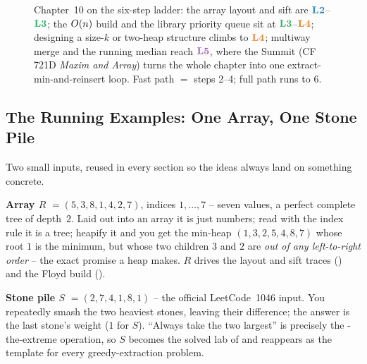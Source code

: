 \begin{figure}[H]
\centering
{}
\caption*{Chapter~10 on the six-step ladder: the array layout and sift are $\lv2$--$\lv3$; the $O(n)$
build and the library priority queue sit at $\lv3$--$\lv4$; designing a size-$k$ or two-heap structure
climbs to $\lv4$; multiway merge and the running median reach $\lv5$, where the Summit (CF 721D
\emph{Maxim and Array}) turns the whole chapter into one extract-min-and-reinsert loop. Fast path $=$
steps 2--4; full path runs to 6.}
\end{figure}

\subsection*{The Running Examples: One Array, One Stone Pile}

Two small inputs, reused in every section so the ideas always land on something concrete.

\textbf{Array $R$} $= (5, 3, 8, 1, 4, 2, 7)$, indices $1,\dots,7$ -- seven values, a perfect complete tree
of depth~$2$. Laid out into an array it is just numbers; read with the index rule it is a tree; heapify
it and you get the min-heap $(1, 3, 2, 5, 4, 8, 7)$ whose root $1$ is the minimum, but whose two children
$3$ and $2$ are \emph{out of any left-to-right order} -- the exact promise a heap makes. $R$ drives the
layout and sift traces () and the Floyd build ().

\textbf{Stone pile $S$} $= (2, 7, 4, 1, 8, 1)$ -- the official LeetCode~1046 input. You repeatedly smash
the two heaviest stones, leaving their difference; the answer is the last stone's weight ($\boxed{1}$ for
$S$). ``Always take the two largest'' is precisely the -the-extreme operation, so $S$ becomes
the solved lab of  and reappears as the template for every greedy-extraction problem.

